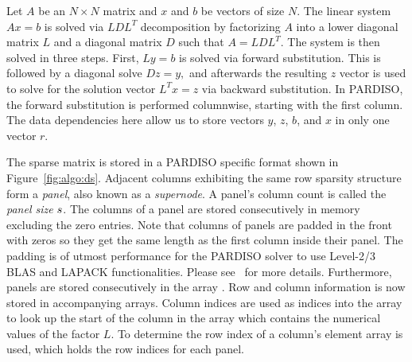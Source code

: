 \label{sec:algo}

Let $A$ be an $N \times N$ matrix and $x$ and $b$ be vectors of size $N$.
The linear system $A x = b$ is solved via $LDL^T$ decomposition by factorizing $A$
into a lower diagonal matrix $L$ and a diagonal matrix $D$ 
such
that $A =
LDL^T$.
The system is then solved in three steps. First,
$
  \label{eq:fw}
  Ly=b
$
is solved via forward substitution. This is followed by a diagonal solve
$
  \label{eq:dg}
  Dz=y,
$
and afterwards the resulting $z$ vector is used to solve for the solution vector 
%
$
  \label{eq:bw}
  L^Tx=z
$
% 
via backward substitution. In 
PARDISO, 
the forward substitution is performed columnwise, starting with the
first column.
The data dependencies here allow us to store vectors $y$, $z$, $b$, and $x$ in
only one vector $r$. 


The sparse matrix is stored in a PARDISO specific format shown in
Figure~\ref{fig:algo:ds}.
Adjacent columns exhibiting the same row sparsity structure form a
\textit{panel}, also known as a \textit{supernode}.
A panel's column count is called the \textit{panel size} $s$.
The columns of a panel are stored consecutively in memory excluding the zero
entries. 
Note that columns of panels are padded in the front with zeros so they get the 
same length as the first column inside their panel. 
The padding is of utmost performance for the PARDISO solver to use Level-2/3
BLAS and LAPACK functionalities. Please see~\cite{Bollhofer2020} for more
details.
Furthermore, panels are stored consecutively in the array \vlnz{}.
Row and column information is now stored in accompanying arrays.
Column indices are used as indices into the array \vxlnz{} to look up the
start of
the column in the array \vlnz{} which contains the numerical values of the factor $L$.
To determine the row index of a column's element array \vindx{} is
used, which holds the row indices for each panel.

